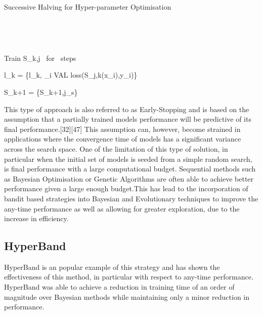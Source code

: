 \documentclass{article}
\begin{document}
	\par
	

		\begin{algorithm}[H]\label{alg:BP1}
			\caption{Successive Halving for Hyper-parameter Optimisation}

			\SetAlgoLined
			\
			
			\KwInit
			\

				{

					{
					Train S_{k,j} ~for~  steps\;

					l_{k} = \{l_k, \sum_{i \in VAL} loss(S_{j,k}(x_i),y_i)\} \;
					

					}


				{
						{

						S_{k+1} = \{S_{k+1},j_s\}

						}

			
			  	}
			
			}

			
		\end{algorithm}



		This type of approach is also referred to as Early-Stopping and is based on the assumption that a partially trained models performance will be predictive of its final performance.[32][47] This assumption can, however, become strained in applications where the convergence time of models has a significant variance across the search space. One of the limitation of this type of solution, in particular when the initial set of models is seeded from a simple random search, is final performance with a large computational budget. Sequential methods such as Bayesian Optimisation or Genetic Algorithms are often able to achieve better performance given a large enough budget.This has lead to the incorporation of bandit based strategies into Bayesian and Evolutionary techniques to improve the any-time performance as well as allowing for greater exploration, due to the increase in efficiency. \cite{32,34,39}


	\subsection{HyperBand}

		HyperBand \cite{HB} is an popular example of this strategy and has shown the effectiveness of this method, in particular with respect to any-time performance. HyperBand was able to achieve a reduction in training time of an order of magnitude over Bayesian methods while maintaining only a minor reduction in performance.
\end{document}
